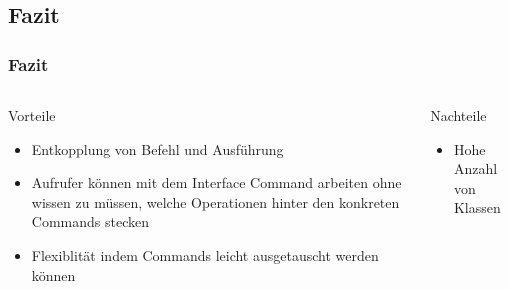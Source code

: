 \subsection{Fazit}
\begin{frame}
	\frametitle{Fazit}
	\begin{columns} 
    		\begin{exampleblock}{Vorteile}
    			\begin{itemize}
    				\item Entkopplung von Befehl und Ausführung
    				\item Aufrufer können mit dem Interface Command arbeiten ohne wissen zu müssen, welche Operationen hinter den konkreten Commands stecken
    				\item Flexiblität indem Commands leicht ausgetauscht werden können
    			\end{itemize}
    		\end{exampleblock}
    		\begin{alertblock}{Nachteile}
    			\begin{itemize}
    				\item Hohe Anzahl von Klassen
    			\end{itemize}
    		\end{alertblock}
  	\end{columns}   	  		
\end{frame}